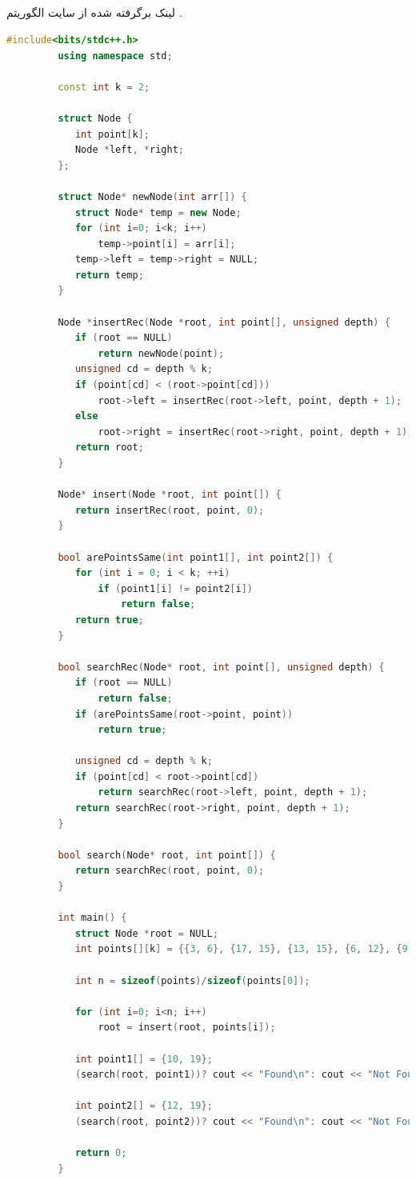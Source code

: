 \documentclass[a4paper,12pt]{report}
\begin{document}
	\subsection{}\label{subsec5:sec1:chap1}
	لینک برگرفته شده از سایت
	\hyperref{https://www.geeksforgeeks.org}{algorithmSite}{geeksforgeeks}{}
	الگوریتم
	\hyperref{https://www.geeksforgeeks.org/k-dimensional-tree/}{K D-tree}{geeksforgeeks}
	{}.
	\cite{Geeksfor41:online}
	\begin{latin}
		\small
		\begin{lstlisting}[language=C++]
		 #include<bits/stdc++.h>
		 using namespace std;

		 const int k = 2;

		 struct Node {
		 	int point[k];
		 	Node *left, *right;
		 };

		 struct Node* newNode(int arr[]) {
		 	struct Node* temp = new Node;
		 	for (int i=0; i<k; i++)
		 		temp->point[i] = arr[i];
		 	temp->left = temp->right = NULL;
		 	return temp;
		 }

		 Node *insertRec(Node *root, int point[], unsigned depth) {
		 	if (root == NULL)
		 		return newNode(point);
		 	unsigned cd = depth % k;
		 	if (point[cd] < (root->point[cd]))
		 		root->left = insertRec(root->left, point, depth + 1);
		 	else
		 		root->right = insertRec(root->right, point, depth + 1);
		 	return root;
		 }

		 Node* insert(Node *root, int point[]) {
		 	return insertRec(root, point, 0);
		 }

		 bool arePointsSame(int point1[], int point2[]) {
		 	for (int i = 0; i < k; ++i)
			 	if (point1[i] != point2[i])
			 		return false;
		 	return true;
		 }

		 bool searchRec(Node* root, int point[], unsigned depth) {
		 	if (root == NULL)
		 		return false;
		 	if (arePointsSame(root->point, point))
		 		return true;

		 	unsigned cd = depth % k;
		 	if (point[cd] < root->point[cd])
		 		return searchRec(root->left, point, depth + 1);
		 	return searchRec(root->right, point, depth + 1);
		 }

		 bool search(Node* root, int point[]) {
		 	return searchRec(root, point, 0);
		 }

		 int main() {
		 	struct Node *root = NULL;
		 	int points[][k] = {{3, 6}, {17, 15}, {13, 15}, {6, 12}, {9, 1}, {2, 7}, {10, 19}};

		 	int n = sizeof(points)/sizeof(points[0]);

		 	for (int i=0; i<n; i++)
			 	root = insert(root, points[i]);

		 	int point1[] = {10, 19};
		 	(search(root, point1))? cout << "Found\n": cout << "Not Found\n";

		 	int point2[] = {12, 19};
		 	(search(root, point2))? cout << "Found\n": cout << "Not Found\n";

		 	return 0;
		 }

		\end{lstlisting}
	\end{latin}
\end{document}
